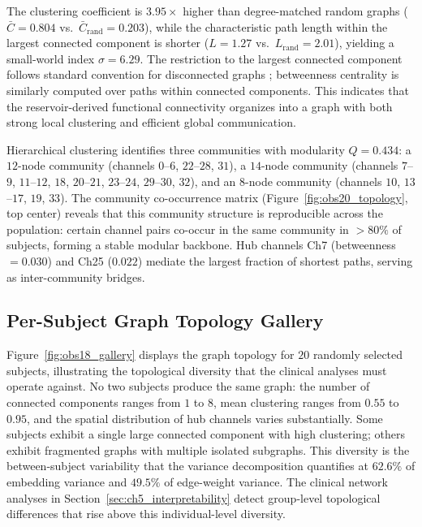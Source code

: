 The clustering coefficient is $3.95\times$ higher than degree-matched random graphs ($\bar{C} = 0.804$ vs.\ $\bar{C}_{\text{rand}} = 0.203$), while the characteristic path length within the largest connected component is shorter ($L = 1.27$ vs.\ $L_{\text{rand}} = 2.01$), yielding a small-world index $\sigma = 6.29$. The restriction to the largest connected component follows standard convention for disconnected graphs \cite{rubinov_complex_2010}; betweenness centrality is similarly computed over paths within connected components. This indicates that the reservoir-derived functional connectivity organizes into a graph with both strong local clustering and efficient global communication.

Hierarchical clustering identifies three communities with modularity $Q = 0.434$: a $12$-node community (channels $0$--$6$, $22$--$28$, $31$), a $14$-node community (channels $7$--$9$, $11$--$12$, $18$, $20$--$21$, $23$--$24$, $29$--$30$, $32$), and an $8$-node community (channels $10$, $13$--$17$, $19$, $33$). The community co-occurrence matrix (Figure~\ref{fig:obs20_topology}, top center) reveals that this community structure is reproducible across the population: certain channel pairs co-occur in the same community in $> 80\%$ of subjects, forming a stable modular backbone. Hub channels Ch7 (betweenness $= 0.030$) and Ch25 ($0.022$) mediate the largest fraction of shortest paths, serving as inter-community bridges.

\subsection{Per-Subject Graph Topology Gallery}

Figure~\ref{fig:obs18_gallery} displays the graph topology for $20$ randomly selected subjects, illustrating the topological diversity that the clinical analyses must operate against. No two subjects produce the same graph: the number of connected components ranges from $1$ to $8$, mean clustering ranges from $0.55$ to $0.95$, and the spatial distribution of hub channels varies substantially. Some subjects exhibit a single large connected component with high clustering; others exhibit fragmented graphs with multiple isolated subgraphs. This diversity is the between-subject variability that the variance decomposition quantifies at $62.6\%$ of embedding variance and $49.5\%$ of edge-weight variance. The clinical network analyses in Section~\ref{sec:ch5_interpretability} detect group-level topological differences that rise above this individual-level diversity.

